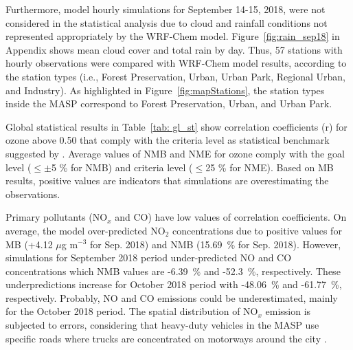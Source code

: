    Furthermore, model hourly simulations for September 14-15, 2018, were not considered in the statistical analysis due to cloud and rainfall conditions not represented appropriately by the WRF-Chem model.
   Figure~\ref{fig:rain_sep18} in Appendix shows mean cloud cover and total rain by day.
   Thus, 57 stations with hourly observations were compared with WRF-Chem model results, according to the station types (i.e., Forest Preservation, Urban, Urban Park, Regional Urban, and Industry).
   As highlighted in Figure~\ref{fig:mapStations}, the station types inside the MASP correspond to Forest Preservation, Urban, and Urban Park.

  Global statistical results in Table~\ref{tab: gl_st} show correlation coefficients (r) for ozone  above 0.50 that comply with the criteria level as statistical benchmark suggested by \citet{Emery2017}.
  Average values of NMB and NME for ozone comply with the goal level ($\leq\pm$5 \% for NMB) and criteria level ($\leq$25 \% for NME).
  Based on MB results, positive values are indicators that simulations are overestimating the observations.
  
  Primary pollutants (NO$_x$ and CO) have low values of correlation coefficients.
  On average, the model over-predicted NO$_2$ concentrations due to positive values for MB (+4.12 $\mu$g m$^{-3}$ for Sep. 2018) and NMB (15.69~\% for Sep. 2018).
  However, simulations for September 2018 period under-predicted NO and CO concentrations which NMB values are -6.39~\% and -52.3~\%, respectively.
  These underpredictions increase for October 2018 period with -48.06~\% and -61.77~\%, respectively.
  Probably, NO and CO emissions could be underestimated, mainly for the October 2018 period.
  The spatial distribution of NO$_x$ emission is subjected to errors, considering that heavy-duty vehicles in the MASP use specific roads where trucks are concentrated on motorways around the city \citep{Ibarra2020}.
  
  
  
